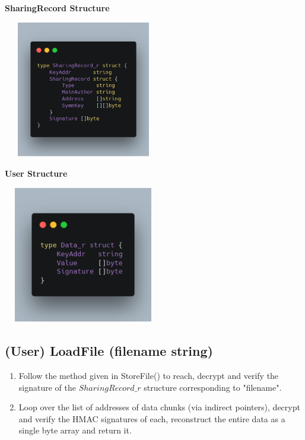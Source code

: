 \documentclass[a4paper, 12pt]{scrartcl}
\begin{document}
\begin{multicols}{2}

\begin{center}
	\textbf{SharingRecord Structure}
\end{center}

\begin{center}
	\includegraphics[width=7cm, height=6cm]{images/sharing.png}
\end{center}

\columnbreak

\begin{center}
	\textbf{User Structure}
\end{center}

\begin{center}
	\includegraphics[width=7cm, height=6cm]{images/data.png}
\end{center}

\end{multicols}

\subsection{(User) LoadFile (filename string)}
\begin{enumerate}
	\itemsep0em
	\item Follow the method given in StoreFile() to reach, decrypt and verify the signature of the $SharingRecord\_r$ structure corresponding to "filename".
	\item Loop over the list of addresses of data chunks (via indirect pointers), decrypt and verify the HMAC signatures of each, reconstruct the entire data as a single byte array and return it.

\end{enumerate}
\end{document}
